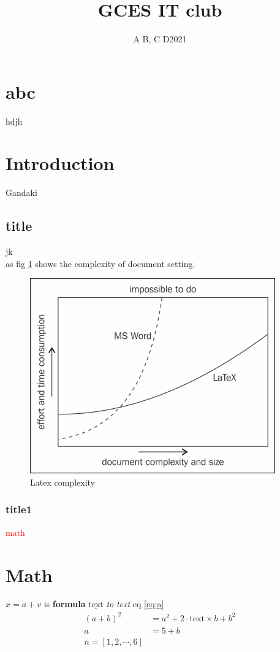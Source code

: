 \documentclass[11pt,a4paper]{article}
\begin{document}
	\title{GCES IT club}
	\vspace{2 in}
	\author{A B, C D2021}
	\maketitle
	\newpage
	\listoffigures
	\newpage
	\tableofcontents
	\newpage
	\section{abc}
	hdjh
	\section{Introduction}
	Gandaki
	\subsection{title}
	jk
	\\
	as fig \ref{fig:complexitylatex} shows the complexity of document setting.
	
\begin{figure}[h]
	\centering
	\includegraphics[width=0.5\linewidth]{Images/complexity_latex}
	\caption{Latex complexity}
	\label{fig:complexitylatex}
\end{figure}
	\subsubsection{title1}
	\textcolor{red} {math}
	\newpage
	\section{Math}
	$x=a+v$ is \textbf{formula} $\underline{\text{text}}$ \textit{to} \emph{text} eq \ref{eq:a}
	\begin{align}
	(a+b)^2 &= a^2 + 2\cdot \text{text} \times b +b^2 \nonumber\\ 
	a&= 5+b \nonumber\\
	n = [1,2,\cdots,6]
	\label{eq:a}
	\end{align}
\end{document}
